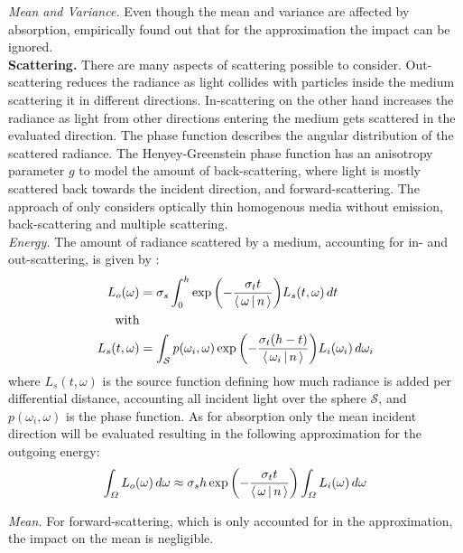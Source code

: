 \textit{Mean and Variance.} Even though the mean and variance are affected by absorption, \textcite{belcour2018} empirically found out that for the approximation the impact can be ignored.\\

\noindent\textbf{Scattering.} There are many aspects of scattering possible to consider. Out-scattering reduces the radiance as light collides with particles inside the medium scattering it in different directions. In-scattering on the other hand increases the radiance as light from other directions entering the medium gets scattered in the evaluated direction. The phase function describes the angular distribution of the scattered radiance. The Henyey-Greenstein phase function has an anisotropy parameter $g$ to model the amount of back-scattering, where light is mostly scattered back towards the incident direction, and forward-scattering. The approach of \textcite{belcour2018} only considers optically thin homogenous media without emission, back-scattering and multiple scattering.\\

\textit{Energy.} The amount of radiance scattered by a medium, accounting for in- and out-scattering, is given by \parencite{belcour2018,pharr2010}:
\begin{equation}
    \begin{aligned}
        L_o(\omega) &= \sigma_s \int_{0}^{h} \exp{\left(-\frac{\sigma_t t}{\dotproduct{\omega}{n}}\right)} L_s(t,\omega) \,dt \\
        \text{with}\\
        L_s(t,\omega) &= \int_{\mathcal{S}} p(\omega_i, \omega) \exp{\left(-\frac{\sigma_t (h-t)}{\dotproduct{\omega_i}{n}}\right)} L_i(\omega_i) \,d\omega_i
    \end{aligned}
\end{equation}
where $L_s(t,\omega)$ is the source function defining how much radiance is added per differential distance, accounting all incident light over the sphere $\mathcal{S}$, and $p(\omega_i, \omega)$ is the phase function.
As for absorption only the mean incident direction will be evaluated resulting in the following approximation for the outgoing energy:
\begin{equation}
    \int_{\Omega} L_o(\omega) \,d\omega \approx \sigma_s h \exp{\left(-\frac{\sigma_t t}{\dotproduct{\omega}{n}}\right)} \int_{\Omega} L_i(\omega) \,d\omega
\end{equation}

\textit{Mean.} For forward-scattering, which is only accounted for in the approximation, the impact on the mean is negligible.\\

